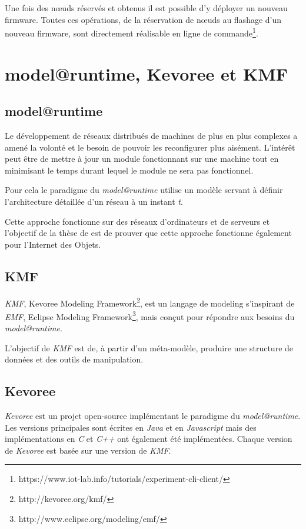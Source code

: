 Une fois des nœuds réservés et obtenus il est possible d'y déployer un nouveau firmware. Toutes ces opérations, de la réservation de nœuds au flashage d'un nouveau firmware, sont directement réalisable en ligne de commande\footnote{https://www.iot-lab.info/tutorials/experiment-cli-client/}.

\section{model@runtime, Kevoree et KMF}

\subsection{model@runtime}

Le développement de réseaux distribués de machines de plus en plus complexes a amené la volonté et le besoin de pouvoir les reconfigurer plus aisément. L'intérêt peut être de mettre à jour un module fonctionnant sur une machine tout en minimisant le temps durant lequel le module ne sera pas fonctionnel.

Pour cela le paradigme du \emph{model@runtime} utilise un modèle servant à définir l'architecture détaillée d'un réseau à un instant \emph{t}.

Cette approche fonctionne sur des réseaux d'ordinateurs et de serveurs \cite{fouquet} et l'objectif de la thèse de \paco est de prouver que cette approche fonctionne également pour l'Internet des Objets.

\subsection{KMF}

\emph{KMF}, Kevoree Modeling Framework\footnote{http://kevoree.org/kmf/}, est un langage de modeling s'inspirant de \emph{EMF}, Eclipse Modeling Framework\footnote{http://www.eclipse.org/modeling/emf/}, mais conçut pour répondre aux besoins du \emph{model@runtime}.

L'objectif de \emph{KMF} est de, à partir d'un méta-modèle, produire une structure de données et des outils de manipulation.

\subsection{\label{kevoree}Kevoree}

\emph{Kevoree} est un projet open-source implémentant le paradigme du \emph{model@runtime}. Les versions principales sont écrites en \emph{Java} et en \emph{Javascript} mais des implémentations en \emph{C} et \emph{C++} ont également été implémentées. Chaque version de \emph{Kevoree} est basée sur une version de \emph{KMF}. 

